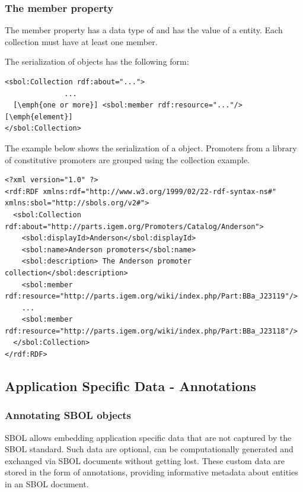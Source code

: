 \subsubsection*{The member property}
The member property has a data type of  and has the  value of a  entity. Each collection must have at least one member.

The serialization of  objects has the following form:

\begin{lstlisting}
<sbol:Collection rdf:about="...">
              ...
  [\emph{one or more}] <sbol:member rdf:resource="..."/> [\emph{element}]
</sbol:Collection>
\end{lstlisting}

The example below shows the serialization of a  object. Promoters from a library of constitutive promoters are grouped using the collection example.
\begin{lstlisting}
<?xml version="1.0" ?>
<rdf:RDF xmlns:rdf="http://www.w3.org/1999/02/22-rdf-syntax-ns#" xmlns:sbol="http://sbols.org/v2#">
  <sbol:Collection rdf:about="http://parts.igem.org/Promoters/Catalog/Anderson">
    <sbol:displayId>Anderson</sbol:displayId>
    <sbol:name>Anderson promoters</sbol:name>
    <sbol:description> The Anderson promoter collection</sbol:description>
    <sbol:member rdf:resource="http://parts.igem.org/wiki/index.php/Part:BBa_J23119"/>
    ...
    <sbol:member rdf:resource="http://parts.igem.org/wiki/index.php/Part:BBa_J23118"/>
  </sbol:Collection>
</rdf:RDF>

\end{lstlisting}
\label{ser:Collection}




\subsection{Application Specific Data - Annotations}
\label{sec:annotations}


\subsubsection{Annotating SBOL objects}
SBOL allows embedding application specific data that are not captured by the SBOL standard. Such data are optional, can be computationally generated and exchanged via SBOL documents without getting lost. These custom data are stored in the form of annotations, providing informative metadata about entities in an SBOL document.

